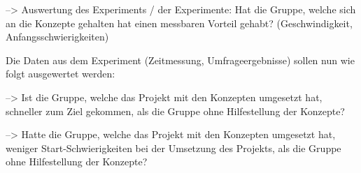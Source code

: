 	--> Auswertung des Experiments / der Experimente: Hat die Gruppe, welche sich an die Konzepte gehalten hat einen messbaren Vorteil gehabt? (Geschwindigkeit, Anfangsschwierigkeiten)
	
Die Daten aus dem Experiment (Zeitmessung, Umfrageergebnisse) sollen nun wie folgt ausgewertet werden:

--> Ist die Gruppe, welche das Projekt mit den Konzepten umgesetzt hat, schneller zum Ziel gekommen, als die Gruppe ohne Hilfestellung der Konzepte?

--> Hatte die Gruppe, welche das Projekt mit den Konzepten umgesetzt hat, weniger Start-Schwierigkeiten bei der Umsetzung des Projekts, als die Gruppe ohne Hilfestellung der Konzepte?










